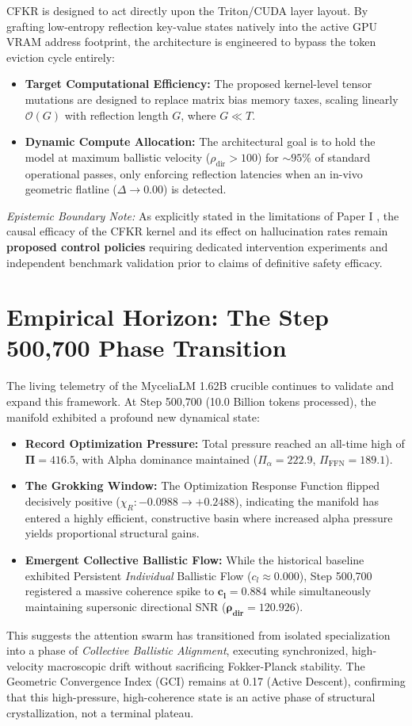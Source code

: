 \documentclass[11pt]{article}
\begin{document}
CFKR is designed to act directly upon the Triton/CUDA layer layout. By grafting low-entropy reflection key-value states natively into the active GPU VRAM address footprint, the architecture is engineered to bypass the token eviction cycle entirely:
\begin{itemize}
    \item \textbf{Target Computational Efficiency:} The proposed kernel-level tensor mutations are designed to replace matrix bias memory taxes, scaling linearly $\mathcal{O}(G)$ with reflection length $G$, where $G \ll T$.
    \item \textbf{Dynamic Compute Allocation:} The architectural goal is to hold the model at maximum ballistic velocity ($\rho_{\text{dir}} > 100$) for $\sim 95\%$ of standard operational passes, only enforcing reflection latencies when an in-vivo geometric flatline ($\Delta \to 0.00$) is detected.
\end{itemize}

\textit{Epistemic Boundary Note:} As explicitly stated in the limitations of Paper I \cite{massif2026}, the causal efficacy of the CFKR kernel and its effect on hallucination rates remain \textbf{proposed control policies} requiring dedicated intervention experiments and independent benchmark validation prior to claims of definitive safety efficacy.

\section{Empirical Horizon: The Step 500,700 Phase Transition}
The living telemetry of the MyceliaLM 1.62B crucible continues to validate and expand this framework. At Step 500,700 (10.0 Billion tokens processed), the manifold exhibited a profound new dynamical state:
\begin{itemize}
    \item \textbf{Record Optimization Pressure:} Total pressure reached an all-time high of $\mathbf{\Pi = 416.5}$, with Alpha dominance maintained ($\Pi_\alpha = 222.9$, $\Pi_{\text{FFN}} = 189.1$).
    \item \textbf{The Grokking Window:} The Optimization Response Function flipped decisively positive ($\chi_R: -0.0988 \to +0.2488$), indicating the manifold has entered a highly efficient, constructive basin where increased alpha pressure yields proportional structural gains.
    \item \textbf{Emergent Collective Ballistic Flow:} While the historical baseline exhibited Persistent \textit{Individual} Ballistic Flow ($c_l \approx 0.000$), Step 500,700 registered a massive coherence spike to $\mathbf{c_l = 0.884}$ while simultaneously maintaining supersonic directional SNR ($\mathbf{\rho_{\text{dir}} = 120.926}$). 
\end{itemize}
This suggests the attention swarm has transitioned from isolated specialization into a phase of \textit{Collective Ballistic Alignment}, executing synchronized, high-velocity macroscopic drift without sacrificing Fokker-Planck stability. The Geometric Convergence Index (GCI) remains at 0.17 (Active Descent), confirming that this high-pressure, high-coherence state is an active phase of structural crystallization, not a terminal plateau.
\end{document}
